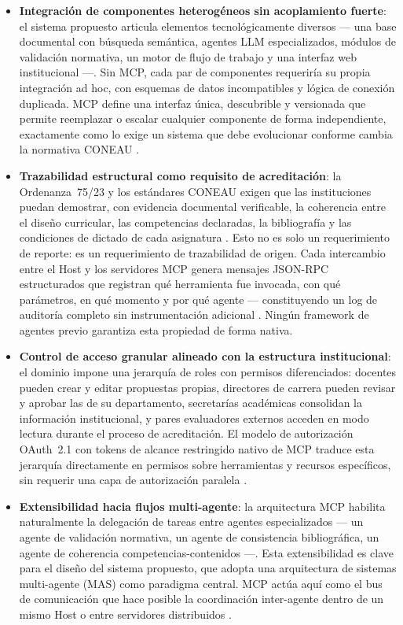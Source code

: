 \begin{itemize}
  \item \textbf{Integración de componentes heterogéneos sin acoplamiento fuerte}: el sistema propuesto articula elementos tecnológicamente diversos --- una base documental con búsqueda semántica, agentes LLM especializados, módulos de validación normativa, un motor de flujo de trabajo y una interfaz web institucional ---. Sin MCP, cada par de componentes requeriría su propia integración ad hoc, con esquemas de datos incompatibles y lógica de conexión duplicada. MCP define una interfaz única, descubrible y versionada que permite reemplazar o escalar cualquier componente de forma independiente, exactamente como lo exige un sistema que debe evolucionar conforme cambia la normativa CONEAU \citep{ehtesham2025survey}.

  \item \textbf{Trazabilidad estructural como requisito de acreditación}: la Ordenanza~75/23 y los estándares CONEAU exigen que las instituciones puedan demostrar, con evidencia documental verificable, la coherencia entre el diseño curricular, las competencias declaradas, la bibliografía y las condiciones de dictado de cada asignatura \citep{ordenanza75}. Esto no es solo un requerimiento de reporte: es un requerimiento de trazabilidad de origen. Cada intercambio entre el Host y los servidores MCP genera mensajes JSON-RPC estructurados que registran qué herramienta fue invocada, con qué parámetros, en qué momento y por qué agente --- constituyendo un log de auditoría completo sin instrumentación adicional \citep{hou2025model}. Ningún framework de agentes previo garantiza esta propiedad de forma nativa.

  \item \textbf{Control de acceso granular alineado con la estructura institucional}: el dominio impone una jerarquía de roles con permisos diferenciados: docentes pueden crear y editar propuestas propias, directores de carrera pueden revisar y aprobar las de su departamento, secretarías académicas consolidan la información institucional, y pares evaluadores externos acceden en modo lectura durante el proceso de acreditación. El modelo de autorización OAuth~2.1 con tokens de alcance restringido nativo de MCP traduce esta jerarquía directamente en permisos sobre herramientas y recursos específicos, sin requerir una capa de autorización paralela \citep{ray2025survey}.

  \item \textbf{Extensibilidad hacia flujos multi-agente}: la arquitectura MCP habilita naturalmente la delegación de tareas entre agentes especializados --- un agente de validación normativa, un agente de consistencia bibliográfica, un agente de coherencia competencias-contenidos ---. Esta extensibilidad es clave para el diseño del sistema propuesto, que adopta una arquitectura de sistemas multi-agente (MAS) como paradigma central. MCP actúa aquí como el bus de comunicación que hace posible la coordinación inter-agente dentro de un mismo Host o entre servidores distribuidos \citep{ehtesham2025survey}.
\end{itemize}

